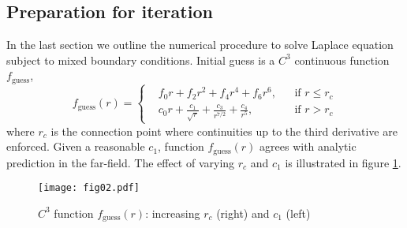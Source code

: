 \documentclass{jfm}
\begin{document}
\subsection{Preparation for iteration}
In the last section we outline the numerical procedure to solve Laplace equation subject to mixed boundary conditions.
Initial guess is a $C^3$ continuous function $f_\mathrm{guess}$,
\begin{equation}
f_\mathrm{guess}(r)=\left\{\begin{aligned}
&f_0r+f_2r^2+f_4r^4+f_6r^6,&&\textrm{if }r\le r_c\\
&c_0 r + \frac{c_1}{\sqrt{r}} +\frac{c_3}{r^{7/2}}+\frac{c_4}{r^{5}},&&\textrm{if }r>r_c
\end{aligned}\right.
\end{equation}
where $r_c$ is the connection point where continuities up to the third derivative are enforced.
Given a reasonable $c_1$, function $f_\mathrm{guess}(r)$ agrees with analytic prediction in the far-field.
The effect of varying $r_c$ and $c_1$ is illustrated in figure \ref{fig:initialGuess}.
\begin{figure}
  \centering
  \texttt{[image: fig02.pdf]}%
  \caption{$C^3$ function $f_\mathrm{guess}(r)$: increasing $r_c$ (right) and $c_1$ (left)  }
\label{fig:initialGuess}
\end{figure}
\end{document}

